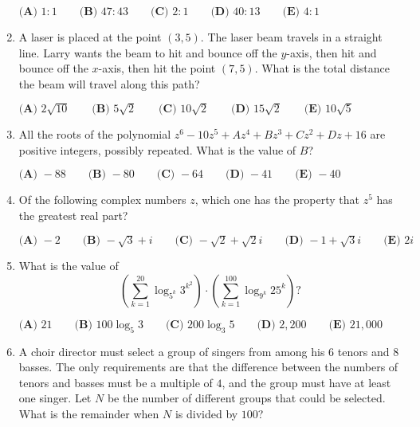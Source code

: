 \documentclass{article}
\begin{document}
\begin{enumerate}[label=\arabic*., itemsep=0.5em]
\(\textbf{(A) }1:1 \qquad \textbf{(B) }47:43 \qquad \textbf{(C) }2:1 \qquad \textbf{(D) }40:13 \qquad \textbf{(E) }4:1\)\par \vspace{0.5em}\item A laser is placed at the point \((3,5)\). The laser beam travels in a straight line. Larry wants the beam to hit and bounce off the \(y\)-axis, then hit and bounce off the \(x\)-axis, then hit the point \((7,5)\). What is the total distance the beam will travel along this path?

\(\textbf{(A) }2\sqrt{10} \qquad \textbf{(B) }5\sqrt2 \qquad \textbf{(C) }10\sqrt2 \qquad \textbf{(D) }15\sqrt2 \qquad \textbf{(E) }10\sqrt5\)\par \vspace{0.5em}\item All the roots of the polynomial \(z^6-10z^5+Az^4+Bz^3+Cz^2+Dz+16\) are positive integers, possibly repeated. What is the value of \(B\)?

\(\textbf{(A) }{-}88 \qquad \textbf{(B) }{-}80 \qquad \textbf{(C) }{-}64 \qquad \textbf{(D) }{-}41\qquad \textbf{(E) }{-}40\)\par \vspace{0.5em}\item Of the following complex numbers \(z\), which one has the property that \(z^5\) has the greatest real part?

\(\textbf{(A) }{-}2 \qquad \textbf{(B) }{-}\sqrt3+i \qquad \textbf{(C) }{-}\sqrt2+\sqrt2 i \qquad \textbf{(D) }{-}1+\sqrt3 i\qquad \textbf{(E) }2i\)\par \vspace{0.5em}\item What is the value of
\begin{equation*}
\left(\sum_{k=1}^{20} \log_{5^k} 3^{k^2}\right)\cdot\left(\sum_{k=1}^{100} \log_{9^k} 25^k\right)?
\end{equation*}

\(\textbf{(A) }21 \qquad \textbf{(B) }100\log_5 3 \qquad \textbf{(C) }200\log_3 5 \qquad \textbf{(D) }2{,}200\qquad \textbf{(E) }21{,}000\)\par \vspace{0.5em}\item A choir director must select a group of singers from among his \(6\) tenors and \(8\) basses. The only
requirements are that the difference between the numbers of tenors and basses must be a multiple
of \(4\), and the group must have at least one singer. Let \(N\) be the number of different groups that could be
selected. What is the remainder when \(N\) is divided by \(100\)?


\end{enumerate}
\end{document}
